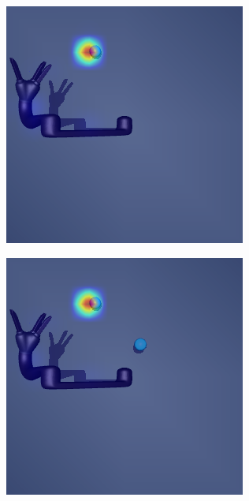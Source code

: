 \begin{figure}
\begin{subfigure}{0.24\columnwidth}
  \end{subfigure}
  \begin{subfigure}{0.24\columnwidth}
    \includegraphics[width=\linewidth]{figures/chapter6/distractor_saliency_jaco_pro_off/standard_visual_random}
  \end{subfigure}
  \begin{subfigure}{0.24\columnwidth}
    \includegraphics[width=\linewidth]{figures/chapter6/distractor_saliency_jaco_pro_off/color_visual_random}
  \end{subfigure}
  

\end{figure}
